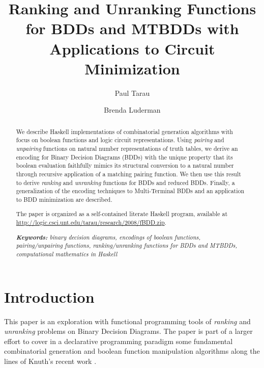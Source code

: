 \documentclass[]{INCLUDES/llncs}
\begin{document}
\title{
  Ranking and Unranking Functions for BDDs and MTBDDs with Applications to
  Circuit Minimization
  }

\author{Paul Tarau \and Brenda Luderman}
\maketitle

\date{}

\begin{abstract}
We describe Haskell implementations of 
combinatorial generation algorithms
with focus on boolean functions and
logic circuit representations.
Using {\em pairing} and {\em unpairing} functions on natural
number representations of truth tables, we derive 
an encoding for Binary Decision Diagrams (BDDs) with the unique property 
that its boolean evaluation faithfully mimics
its structural conversion to a natural number
through recursive application of a matching pairing function.
We then use this result to derive {\em ranking} and {\em unranking}
functions for BDDs and reduced BDDs.
Finally, a generalization of the encoding 
techniques to Multi-Terminal BDDs and an application 
to BDD minimization are described.

The paper is organized as a self-contained literate Haskell program,
available at \url{http://logic.csci.unt.edu/tarau/research/2008/fBDD.zip}.

{\em 
{\bf Keywords:}
binary decision diagrams,
encodings of boolean functions,
pairing/unpairing functions,
ranking/unranking functions for BDDs and MTBDDs,
computational mathematics in Haskell
}
\end{abstract}

\section{Introduction}

This paper is an exploration with functional programming tools of {\em ranking}
and {\em unranking} problems on Binary Decision Diagrams. The paper is part
of a larger effort to cover in a declarative programming 
paradigm some fundamental combinatorial generation and boolean function
manipulation algorithms along the lines of Knuth's recent
work \cite{knuth06draft}.
\end{document}
